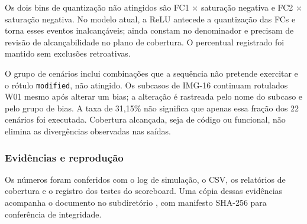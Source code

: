 \documentclass[12pt,a4paper]{article}
\newcommand{\arquivo}[1]{\texttt{\detokenize{#1}}}
\begin{document}
Os dois bins de quantização não atingidos são FC1 $\times$ saturação negativa e FC2 $\times$ saturação negativa. No modelo atual, a ReLU antecede a quantização das FCs e torna esses eventos inalcançáveis; ainda constam no denominador e precisam de revisão de alcançabilidade no plano de cobertura. O percentual registrado foi mantido sem exclusões retroativas.

O grupo de cenários inclui combinações que a sequência não pretende exercitar e o rótulo \texttt{modified}, não atingido. Os subcasos de IMG-16 continuam rotulados W01 mesmo após alterar um bias; a alteração é rastreada pelo nome do subcaso e pelo grupo de bias. A taxa de 31,15\% não significa que apenas essa fração dos 22 cenários foi executada. Cobertura alcançada, seja de código ou funcional, não elimina as divergências observadas nas saídas.

\subsubsection{Evidências e reprodução}
Os números foram conferidos com o log de simulação, o CSV, os relatórios de cobertura e o registro dos testes do scoreboard. Uma cópia dessas evidências acompanha o documento no subdiretório \arquivo{evidencias}, com manifesto SHA-256 para conferência de integridade.
\end{document}
